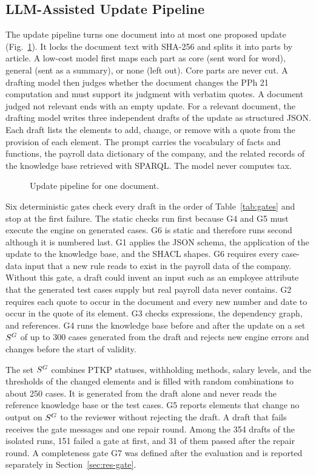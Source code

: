 \subsection{LLM-Assisted Update Pipeline}
\label{sec:acquisition}
The update pipeline turns one document into at most one proposed update (Fig.~\ref{fig:acqflow}). It locks the document text with SHA-256 and splits it into parts by article. A low-cost model first maps each part as core (sent word for word), general (sent as a summary), or none (left out). Core parts are never cut. A drafting model then judges whether the document changes the PPh 21 computation and must support its judgment with verbatim quotes. A document judged not relevant ends with an empty update. For a relevant document, the drafting model writes three independent drafts of the update as structured JSON. Each draft lists the elements to add, change, or remove with a quote from the provision of each element. The prompt carries the vocabulary of facts and functions, the payroll data dictionary of the company, and the related records of the knowledge base retrieved with SPARQL. The model never computes tax.

\begin{figure}[!t]
\centering
\figAcquisitionFlow
\caption{Update pipeline for one document.}
\label{fig:acqflow}
\end{figure}

Six deterministic gates check every draft in the order of Table~\ref{tab:gates} and stop at the first failure. The static checks run first because G4 and G5 must execute the engine on generated cases. G6 is static and therefore runs second although it is numbered last. G1 applies the JSON schema, the application of the update to the knowledge base, and the SHACL shapes. G6 requires every case-data input that a new rule reads to exist in the payroll data of the company. Without this gate, a draft could invent an input such as an employee attribute that the generated test cases supply but real payroll data never contains. G2 requires each quote to occur in the document and every new number and date to occur in the quote of its element. G3 checks expressions, the dependency graph, and references. G4 runs the knowledge base before and after the update on a set $S^{G}$ of up to 300 cases generated from the draft and rejects new engine errors and changes before the start of validity.

The set $S^{G}$ combines PTKP statuses, withholding methods, salary levels, and the thresholds of the changed elements and is filled with random combinations to about 250 cases. It is generated from the draft alone and never reads the reference knowledge base or the test cases. G5 reports elements that change no output on $S^{G}$ to the reviewer without rejecting the draft. A draft that fails receives the gate messages and one repair round. Among the 354 drafts of the isolated runs, 151 failed a gate at first, and 31 of them passed after the repair round. A completeness gate G7 was defined after the evaluation and is reported separately in Section~\ref{sec:res-gate}.

